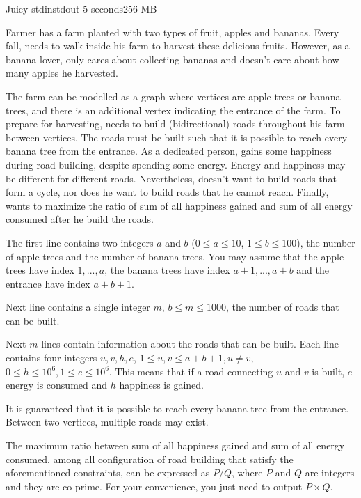 \begin{problem}{Juicy}
{stdin}{stdout}
{5 seconds}{256 MB}{}

Farmer \pittoresque has a farm planted with two types of fruit, apples and bananas. Every fall, \pittoresque needs to walk inside his farm to harvest these delicious fruits. However, as a banana-lover, \pittoresque only cares about collecting bananas and doesn't care about how many apples he harvested.

The farm can be modelled as a graph where vertices are apple trees or banana trees, and there is an additional vertex indicating the entrance of the farm. To prepare for harvesting, \pittoresque needs to build (bidirectional) roads throughout his farm between vertices. The roads must be built such that it is possible to reach every banana tree from the entrance. As a dedicated person, \pittoresque gains some happiness during road building, despite spending some energy. Energy and happiness may be different for different roads. Nevertheless, \pittoresque doesn't want to build roads that form a cycle, nor does he want to build roads that he cannot reach. Finally, \pittoresque wants to maximize the ratio of sum of all happiness gained and sum of all energy consumed after he build the roads.

\InputFile

The first line contains two integers $a$ and $b$ ($0 \le a \le 10$, $1 \le b \le 100$), the number of apple trees and the number of banana trees. You may assume that the apple trees have index $1, ..., a$, the banana trees have index $a + 1, ..., a + b$ and the entrance have index $a + b + 1$.

Next line contains a single integer $m$, $b \leq m \leq 1000$, the number of roads that can be built.

Next $m$ lines contain information about the roads that can be built. Each line contains four integers $u, v, h, e$, $1 \le u, v \le a + b + 1, u \neq v$, $0 \le h \le 10^6, 1 \le e \le 10^6$. This means that if a road connecting $u$ and $v$ is built, $e$ energy is consumed and $h$ happiness is gained.

It is guaranteed that it is possible to reach every banana tree from the entrance. Between two vertices, multiple roads may exist.

\OutputFile

The maximum ratio between sum of all happiness gained and sum of all energy consumed, among all configuration of road building that satisfy the aforementioned constraints, can be expressed as $P/Q$, where $P$ and $Q$ are integers and they are co-prime. For your convenience, you just need to output $P\times Q$.

\newpage

\Examples

\begin{example}
%
\end{example}

\begin{example}
%
\end{example}



\end{problem}

